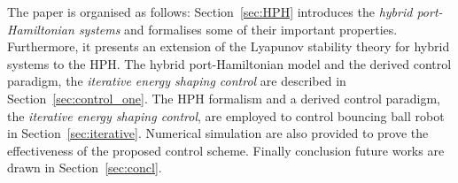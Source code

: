{The paper is organised as follows: Section~\ref{sec:HPH} introduces the \textit{hybrid port-Hamiltonian systems} and formalises some of their important properties. Furthermore, it presents an extension of the Lyapunov stability theory for hybrid systems to the HPH.
The hybrid port-Hamiltonian model and the derived control paradigm, the \textit{iterative energy shaping control} are described in Section~\ref{sec:control_one}. 
The HPH formalism and a derived control paradigm, the \textit{iterative energy shaping control}, are employed to control bouncing ball robot in Section~\ref{sec:iterative}. Numerical simulation are also provided to prove the effectiveness of the proposed control scheme.
Finally conclusion future works are drawn in Section~\ref{sec:concl}.


}
